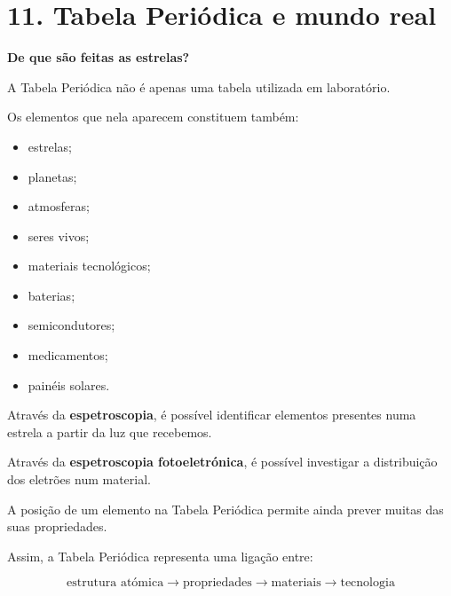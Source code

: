 \documentclass[11pt,a4paper]{article}
\begin{document}
	
	\section*{\textcolor{eugreen}{11. Tabela Periódica e mundo real}}
	
	\begin{stem}
		
		\textbf{De que são feitas as estrelas?}
		
		A Tabela Periódica não é apenas uma tabela utilizada em laboratório.
		
		Os elementos que nela aparecem constituem também:
		
		\begin{itemize}
			
			\item estrelas;
			
			\item planetas;
			
			\item atmosferas;
			
			\item seres vivos;
			
			\item materiais tecnológicos;
			
			\item baterias;
			
			\item semicondutores;
			
			\item medicamentos;
			
			\item painéis solares.
			
		\end{itemize}
		
		Através da \textbf{espetroscopia}, é possível identificar elementos
		presentes numa estrela a partir da luz que recebemos.
		
		Através da \textbf{espetroscopia fotoeletrónica}, é possível investigar
		a distribuição dos eletrões num material.
		
		A posição de um elemento na Tabela Periódica permite ainda prever muitas
		das suas propriedades.
		
		Assim, a Tabela Periódica representa uma ligação entre:
		
		\[
		\boxed{
			\text{estrutura atómica}
			\longrightarrow
			\text{propriedades}
			\longrightarrow
			\text{materiais}
			\longrightarrow
			\text{tecnologia}
		}
		\]
		
	\end{stem}
	
\end{document}
